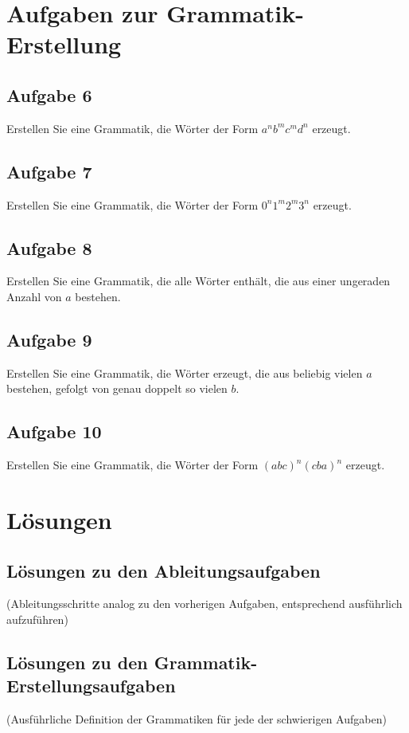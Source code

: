 \documentclass[a4paper,12pt]{article}
\begin{document}
	\newpage
	\section*{Aufgaben zur Grammatik-Erstellung}
	
	\subsection*{Aufgabe 6}
	Erstellen Sie eine Grammatik, die Wörter der Form $a^n b^m c^m d^n$ erzeugt.
	
	\subsection*{Aufgabe 7}
	Erstellen Sie eine Grammatik, die Wörter der Form $0^n 1^m 2^m 3^n$ erzeugt.
	
	\subsection*{Aufgabe 8}
	Erstellen Sie eine Grammatik, die alle Wörter enthält, die aus einer ungeraden Anzahl von $a$ bestehen.
	
	\subsection*{Aufgabe 9}
	Erstellen Sie eine Grammatik, die Wörter erzeugt, die aus beliebig vielen $a$ bestehen, gefolgt von genau doppelt so vielen $b$.
	
	\subsection*{Aufgabe 10}
	Erstellen Sie eine Grammatik, die Wörter der Form $(abc)^n (cba)^n$ erzeugt.
	
	\newpage
	\section*{Lösungen}
	
	\subsection*{Lösungen zu den Ableitungsaufgaben}
	(Ableitungsschritte analog zu den vorherigen Aufgaben, entsprechend ausführlich aufzuführen)
	
	\subsection*{Lösungen zu den Grammatik-Erstellungsaufgaben}
	(Ausführliche Definition der Grammatiken für jede der schwierigen Aufgaben)
	
\end{document}
